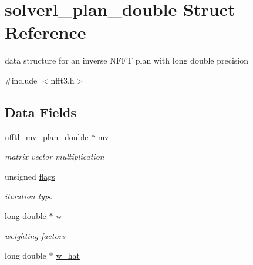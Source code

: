 \hypertarget{structsolverl__plan__double}{\section{solverl\-\_\-plan\-\_\-double Struct Reference}
\label{structsolverl__plan__double}
}


data structure for an inverse N\-F\-F\-T plan with long double precision  




{\ttfamily \#include $<$nfft3.\-h$>$}

\subsection*{Data Fields}
\begin{DoxyCompactItemize}
\item 
\hypertarget{structsolverl__plan__double_a56e946ecb94fc633a9d518d347725c4c}{\hyperlink{structnfftl__mv__plan__double}{nfftl\-\_\-mv\-\_\-plan\-\_\-double} $\ast$ \hyperlink{structsolverl__plan__double_a56e946ecb94fc633a9d518d347725c4c}{mv}}\label{structsolverl__plan__double_a56e946ecb94fc633a9d518d347725c4c}

\begin{DoxyCompactList}\small\item\em matrix vector multiplication \end{DoxyCompactList}\item 
\hypertarget{structsolverl__plan__double_aa95251443f265effb6093d63b6536431}{unsigned \hyperlink{structsolverl__plan__double_aa95251443f265effb6093d63b6536431}{flags}}\label{structsolverl__plan__double_aa95251443f265effb6093d63b6536431}

\begin{DoxyCompactList}\small\item\em iteration type \end{DoxyCompactList}\item 
\hypertarget{structsolverl__plan__double_a0f45b9d16576986d6d6d9605f6891f3d}{long double $\ast$ \hyperlink{structsolverl__plan__double_a0f45b9d16576986d6d6d9605f6891f3d}{w}}\label{structsolverl__plan__double_a0f45b9d16576986d6d6d9605f6891f3d}

\begin{DoxyCompactList}\small\item\em weighting factors \end{DoxyCompactList}\item 
\hypertarget{structsolverl__plan__double_aaa9d07d5f3ec0f7f7f0a6193927e1a94}{long double $\ast$ \hyperlink{structsolverl__plan__double_aaa9d07d5f3ec0f7f7f0a6193927e1a94}{w\-\_\-hat}}\label{structsolverl__plan__double_aaa9d07d5f3ec0f7f7f0a6193927e1a94}


\end{DoxyCompactItemize}
